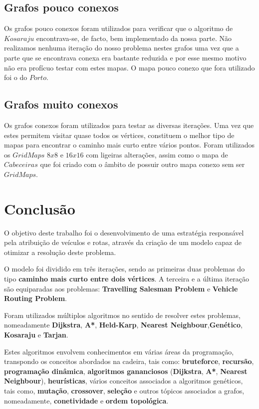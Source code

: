 \documentclass[article, a4paper, 12pt, oneside]{memoir}
\begin{document}
\section{Grafos pouco conexos}
Os grafos pouco conexos foram utilizados para verificar que o algoritmo de $Kosaraju$ encontrava-se, de facto, bem implementado da nossa parte. Não 
realizamos nenhuma iteração do nosso problema nestes grafos uma vez que a parte que se encontrava conexa era bastante reduzida e por esse mesmo motivo não era profícuo
testar com estes mapas.
O mapa pouco conexo que fora utilizado foi o do $Porto$.

\section{Grafos muito conexos}
Os grafos conexos foram utilizados para testar as diversas iterações. Uma vez que estes permitem visitar quase todos os vértices, constituem o melhor tipo
de mapas para encontrar o caminho mais curto entre vários pontos. Foram utilizados os $GridMaps$ $8x8$ e $16x16$ com ligeiras alterações, assim como o mapa de $Cabeceiras$
que foi criado com o âmbito de possuir outro mapa conexo sem ser $GridMaps$.

\newpage
\chapter[Conclusão][Conclusão]{Conclusão} \label{\thechapter}

O objetivo deste trabalho foi o desenvolvimento de uma estratégia responsável pela atribuição de veículos e rotas, através da criação de um modelo capaz de otimizar a resolução deste problema.

O modelo foi dividido em três iterações, sendo as primeiras duas problemas do tipo \textbf{caminho mais curto entre dois vértices}. A terceira e a última iteração são equiparadas aos problemas: \textbf{Travelling Salesman Problem} e \textbf{Vehicle Routing Problem}.

Foram utilizados múltiplos algoritmos no sentido de resolver estes problemas, nomeadamente \textbf{Dijkstra}, \textbf{A*}, \textbf{Held-Karp}, \textbf{Nearest Neighbour},\textbf{Genético}, \textbf{Kosaraju} e \textbf{Tarjan}.

Estes algoritmos envolvem conhecimentos em várias áreas da programação, transpondo os conceitos abordados na cadeira, tais como: \textbf{bruteforce}, \textbf{recursão}, \textbf{programação dinâmica}, \textbf{algoritmos gananciosos} (\textbf{Dijkstra}, \textbf{A*}, \textbf{Nearest Neighbour}), \textbf{heurísticas}, vários conceitos associados a algoritmos genéticos, tais como, \textbf{mutação}, \textbf{crossover}, \textbf{seleção} e outros tópicos associados a grafos, nomeadamente, \textbf{conetividade} e  \textbf{ordem topológica}.
\end{document}
